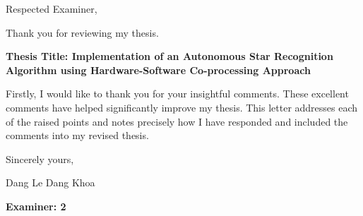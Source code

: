 \documentclass[dvips,a4paper,12pt]{report}
\begin{document}


\noindent Respected Examiner,

\noindent Thank you for reviewing my thesis.

\begin{center}
    \textbf{Thesis Title: Implementation of an Autonomous Star Recognition Algorithm using Hardware-Software Co-processing Approach} 
\end{center}

\noindent Firstly, I would like to thank you for your insightful comments. These excellent comments have helped significantly improve my thesis. This letter addresses each of the raised points and notes precisely how I have responded and included the comments into my revised thesis. \\

\vspace{0.5in}

\noindent Sincerely yours,

\noindent Dang Le Dang Khoa

\newpage

\color{blue}
\noindent \large{\textbf{Examiner: 2}}
\end{document}
